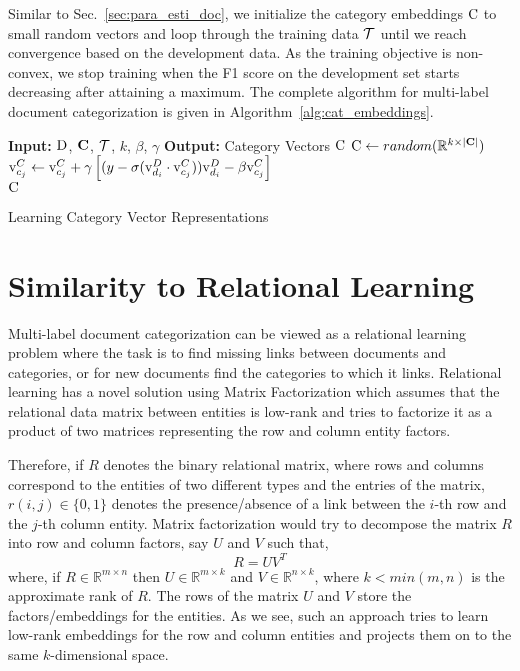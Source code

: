 Similar to Sec.~\ref{sec:para_esti_doc}, we initialize the category embeddings $\mathrm{C}$ to small random vectors and loop through the training data $\mathcal{T}$ until we reach convergence based on the development data. As the training objective is non-convex, we stop training when the F1 score on the development set starts decreasing after attaining a maximum. The complete algorithm for multi-label document categorization is given in Algorithm~\ref{alg:cat_embeddings}.

\begin{algorithm}[h]
\begin{algorithmic}[1]
 \State \textbf{Input: } $\mathrm{D}$, $\mathbf{C}$, $\mathcal{T}$, $k$, $\beta$, $\gamma$
 \State \textbf{Output: } Category Vectors $\mathrm{C}$
 \State $\mathrm{C} \gets random(\mathbb{R}^{k \times |\mathbf{C}|})$
  \State $\mathrm{v}^{C}_{c_{j}} \gets \mathrm{v}^{C}_{c_{j}} + \gamma \left[ ( y - \sigma(\mathrm{v}^{D}_{d_{i}}\cdot \mathrm{v}^{C}_{c_{j}})) \mathrm{v}^{D}_{d_{i}} -\beta\mathrm{v}^{C}_{c_{j}} \right]$
 \EndFor 
 \EndWhile
 \\
 \Return $\mathrm{C}$
\end{algorithmic}
\caption{Learning Category Vector Representations}
\label{alg:cat_embeddings}
\end{algorithm}

\section{Similarity to Relational Learning}
\label{sec:lr_similar_rl}
Multi-label document categorization can be viewed as a relational learning problem where the task is to find missing links between documents and categories, or for new documents find the categories to which it links. Relational learning has a novel solution using Matrix Factorization which assumes that the relational data matrix between entities is low-rank and tries to factorize it as a product of two matrices representing the row and column entity factors. 

Therefore, if $R$ denotes the binary relational matrix, where rows and columns correspond to the entities of two different types and the entries of the matrix, $r(i, j) \in \{0,1\}$ denotes the presence/absence of a link between the $i$-th row and the $j$-th column entity. Matrix factorization would try to decompose the matrix $R$ into row and column factors, say $U$ and $V$ such that,
\begin{equation}
\label{eq:mf_decompose}
R = UV^{T}
\end{equation}
where, if $R \in \mathbb{R}^{m \times n}$ then $U \in \mathbb{R}^{m \times k}$ and $V \in \mathbb{R}^{n \times k}$, where $k < min(m, n)$ is the approximate rank of $R$. The rows of the matrix $U$ and $V$ store the factors/embeddings for the entities. As we see, such an approach tries to learn low-rank embeddings for the row and column entities and projects them on to the same $k$-dimensional space.

